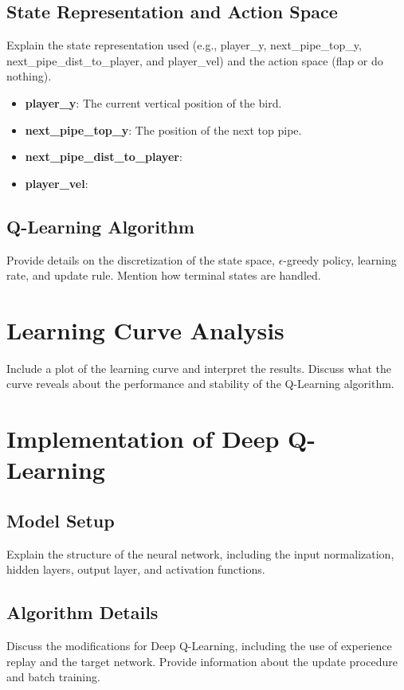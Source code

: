 \documentclass[a4paper,12pt]{article}
\begin{document}
\subsection{State Representation and Action Space}
Explain the state representation used (e.g., player\_y, next\_pipe\_top\_y, next\_pipe\_dist\_to\_player, and player\_vel) and the action space (flap or do nothing).

\begin{itemize}
    \item \textbf{player\_y}: The current vertical position of the bird.
    \item \textbf{next\_pipe\_top\_y}: The position of the next top pipe.
    \item \textbf{next\_pipe\_dist\_to\_player}: 
    \item \textbf{player\_vel}: 
\end{itemize}

\subsection{Q-Learning Algorithm}
Provide details on the discretization of the state space, \(\epsilon\)-greedy policy, learning rate, and update rule. Mention how terminal states are handled.

\section{Learning Curve Analysis}
Include a plot of the learning curve and interpret the results. Discuss what the curve reveals about the performance and stability of the Q-Learning algorithm.

\section{Implementation of Deep Q-Learning}
\subsection{Model Setup}
Explain the structure of the neural network, including the input normalization, hidden layers, output layer, and activation functions.

\subsection{Algorithm Details}
Discuss the modifications for Deep Q-Learning, including the use of experience replay and the target network. Provide information about the update procedure and batch training.
\end{document}
